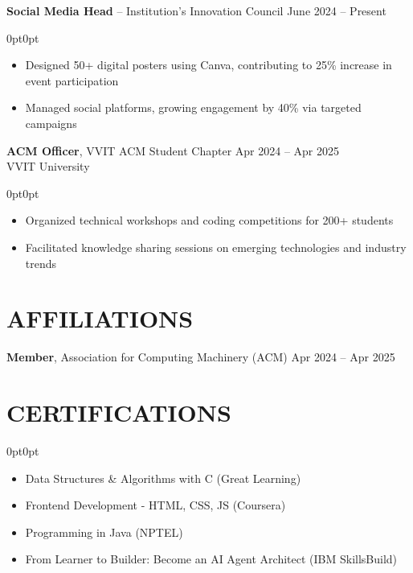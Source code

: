 \documentclass[9pt,letterpaper]{article}
\newenvironment{onecolentry}{\begin{adjustwidth}{0pt}{0pt}}{\end{adjustwidth}}
\newenvironment{highlights}{
    \begin{itemize}[
        topsep=0.05cm,
        parsep=0.05cm,
        partopsep=0pt,
        itemsep=0pt,
        leftmargin=8pt
    ]
}{\end{itemize}}
\newenvironment{highlightsforbulletentries}{
    \begin{itemize}[
        topsep=0.05cm,
        parsep=0.05cm,
        partopsep=0pt,
        itemsep=0pt,
        leftmargin=10pt
    ]
}{\end{itemize}}
\begin{document}
\vspace{0.1cm}

\noindent
\textbf{Social Media Head} -- Institution's Innovation Council \hfill June 2024 -- Present
\vspace{0.05cm}
\begin{onecolentry}
\begin{highlights}
    \item Designed 50+ digital posters using Canva, contributing to 25\% increase in event participation
    \item Managed social platforms, growing engagement by 40\% via targeted campaigns
\end{highlights}
\end{onecolentry}

\vspace{0.1cm}

\noindent
\textbf{ACM Officer}, VVIT ACM Student Chapter \hfill Apr 2024 -- Apr 2025 \\
VVIT University
\vspace{0.05cm}
\begin{onecolentry}
\begin{highlights}
    \item Organized technical workshops and coding competitions for 200+ students
    \item Facilitated knowledge sharing sessions on emerging technologies and industry trends
\end{highlights}
\end{onecolentry}

\section{AFFILIATIONS}

\noindent
\textbf{Member}, Association for Computing Machinery (ACM) \hfill Apr 2024 -- Apr 2025

\section{CERTIFICATIONS}
\begin{onecolentry}
\begin{highlightsforbulletentries}
    \item Data Structures \& Algorithms with C (Great Learning)
    \item Frontend Development - HTML, CSS, JS (Coursera)
    \item Programming in Java (NPTEL)
    \item From Learner to Builder: Become an AI Agent Architect (IBM SkillsBuild)
\end{highlightsforbulletentries}
\end{onecolentry}
\end{document}
